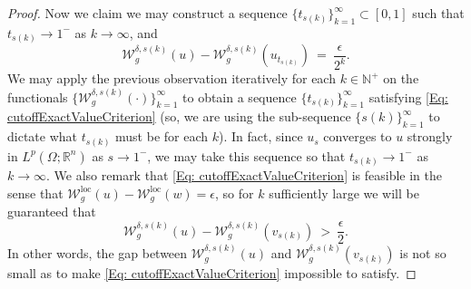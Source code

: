 \documentclass[11pt, reqno]{amsart}   	%
\theoremstyle{plain}
\numberwithin{equation}{section}
\def\de{\delta}
\def\ep{\epsilon}
\def\Om{\Omega}
\def\N{\mathbb{N}}
\def\R{\mathbb{R}}
\def\loc{\text{loc}}
\begin{document}
\begin{proof}

     Now we claim we may construct a sequence $\{t_{s(k)}\}^{\infty}_{k = 1} \subset [0, 1]$ such that $t_{s(k)} \rightarrow 1^-$ as $k \rightarrow \infty$, and
     \begin{equation}\label{Eq: cutoffExactValueCriterion}
         \mathcal{W}^{\de, s(k)}_g(u) - \mathcal{W}^{\de, s(k)}_g(u_{t_{s(k)}}) \ = \ \frac{\ep}{2^k}.
     \end{equation}
     We may apply the previous observation iteratively for each $k \in \N^+$ on the functionals $\{\mathcal{W}^{\de, s(k)}_g(\cdot)\}^{\infty}_{k = 1}$ to obtain a sequence $\{t_{s(k)}\}^{\infty}_{k = 1}$ satisfying \eqref{Eq: cutoffExactValueCriterion} (so, we are using the sub-sequence $\{s(k)\}^{\infty}_{k = 1}$ to dictate what $t_{s(k)}$ must be for each $k$). In fact, since $u_s$ converges to $u$ strongly in $L^p(\Om; \R^n)$ as $s \rightarrow 1^-$, we may take this sequence so that $t_{s(k)} \rightarrow 1^-$ as $k \rightarrow \infty$. We also remark that \eqref{Eq: cutoffExactValueCriterion} is feasible in the sense that $\mathcal{W}^{\loc}_g(u) - \mathcal{W}^{\loc}_g(w) = \ep$, so for $k$ sufficiently large we will be guaranteed that
     \begin{equation}\label{Eq: QuasiMinimizersConvergenceOfMinss->1MinimizationEq5}
         \mathcal{W}^{\de, s(k)}_g(u) - \mathcal{W}^{\de, s(k)}_g(v_{s(k)}) \ > \ \frac{\ep}{2}.
     \end{equation}
     In other words, the gap between $ \mathcal{W}^{\de, s(k)}_g(u)$ and $\mathcal{W}^{\de, s(k)}_g(v_{s(k)})$ is not so small as to make \eqref{Eq: cutoffExactValueCriterion} impossible to satisfy.
     

\end{proof}
\end{document}
